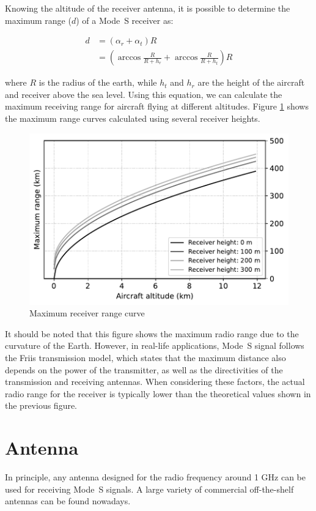 Knowing the altitude of the receiver antenna, it is possible to determine the maximum range ($d$) of a Mode~S receiver as:

\begin{align}
  d &= (\alpha_r + \alpha_t) R \\
  & = \left( \arccos \frac{R}{R+h_r} + \arccos \frac{R}{R+h_t} \right) R
\end{align}

\noindent where $R$ is the radius of the earth, while $h_t$ and $h_r$ are the height of the aircraft and receiver above the sea level. Using this equation, we can calculate the maximum receiving range for aircraft flying at different altitudes. Figure \ref{fig:max_range_curve} shows the maximum range curves calculated using several receiver heights.

\begin{figure}[ht]
  \centering
  \includegraphics[scale=0.65]{figures/quickstart/max_range_curve.pdf}
  \caption{Maximum receiver range curve}
  \label{fig:max_range_curve}
\end{figure}


It should be noted that this figure shows the maximum radio range due to the curvature of the Earth. However, in real-life applications, Mode~S signal follows the Friis transmission model, which states that the maximum distance also depends on the power of the transmitter, as well as the directivities of the transmission and receiving antennas. When considering these factors, the actual radio range for the receiver is typically lower than the theoretical values shown in the previous figure.

\section{Antenna}
In principle, any antenna designed for the radio frequency around 1 GHz can be used for receiving Mode~S signals. A large variety of commercial off-the-shelf antennas can be found nowadays. 

